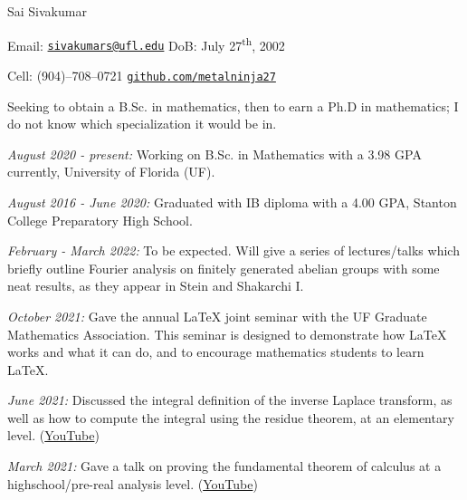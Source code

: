 \documentclass[11pt]{article}
\begin{document}
{\huge Sai Sivakumar}

Email: \href{mailto:sivakumars@ufl.edu}{\texttt{sivakumars@ufl.edu}}\hspace{5cm} DoB: July 27\textsuperscript{th}, 2002

Cell: (904)--708--0721\hspace{6.38cm} \href{https://github.com/metalninja27}{\texttt{github.com/metalninja27}} \\

\noindent{}

Seeking to obtain a B.Sc. in mathematics, then to earn a Ph.D in mathematics; I do not know which specialization it would be in.

\noindent{}

\textsl{August 2020 - present:} Working on B.Sc. in Mathematics with a 3.98 GPA currently, University of Florida (UF).

\textsl{August 2016 - June 2020:} Graduated with IB diploma with a 4.00 GPA, Stanton College Preparatory High School.



\noindent{}

\textsl{February - March 2022:} To be expected. Will give a series of lectures/talks which briefly outline Fourier analysis on finitely generated abelian groups with some neat results, as they appear in Stein and Shakarchi I.

\textsl{October 2021:} Gave the annual \LaTeX\hspace{1pt} joint seminar with the UF Graduate Mathematics Association. This seminar is designed to demonstrate how \LaTeX\hspace{1pt} works and what it can do, and to encourage mathematics students to learn \LaTeX\hspace{1pt}.

\textsl{June 2021:} Discussed the integral definition of the inverse Laplace transform, as well as how to compute the integral using the residue theorem, at an elementary level. ({\color{blue}\href{https://youtu.be/20Xbrit2chw}{YouTube}})

\textsl{March 2021:} Gave a talk on proving the fundamental theorem of calculus at a highschool/pre-real analysis level. ({\color{blue}\href{https://youtu.be/l4GO-n-2ETQ}{YouTube}})
\end{document}
